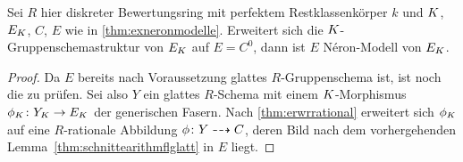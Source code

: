 \documentclass[german, bibliography=totoc]{scrreprt}
\begin{document}
\begin{Satz}\label{thm:fallstriktehenselisierung}
  Sei $R$ hier %
  diskreter Bewertungsring mit
  perfektem Restklassenkörper $k$
  und $K$, $E_{K}$, $C$, $E$ wie in \ref{thm:exneronmodelle}.
  Erweitert sich die $K$-Gruppenschemastruktur von $E_{K}$ auf
  $E=C^0$, dann ist $E$ Néron-Modell von $E_{K}$.
  \begin{proof}
    Da $E$ bereits nach Voraussetzung glattes $R$-Gruppenschema ist,
    ist noch die \NAbbEig zu prüfen.
    Sei also $Y$ ein glattes $R$-Schema mit einem $K$-Morphismus
    $\phi_{K}\colon Y_{K}\to E_{K}$ der generischen Fasern.
    Nach \ref{thm:erwrrational} erweitert sich $\phi_{K}$ auf eine
    $R$-rationale Abbildung $\phi\colon Y\dashrightarrow C$, deren Bild nach dem
    vorhergehenden Lemma~\ref{thm:schnittearithmflglatt} in $E$
    liegt.
    

\end{proof}
\end{Satz}
\end{document}
